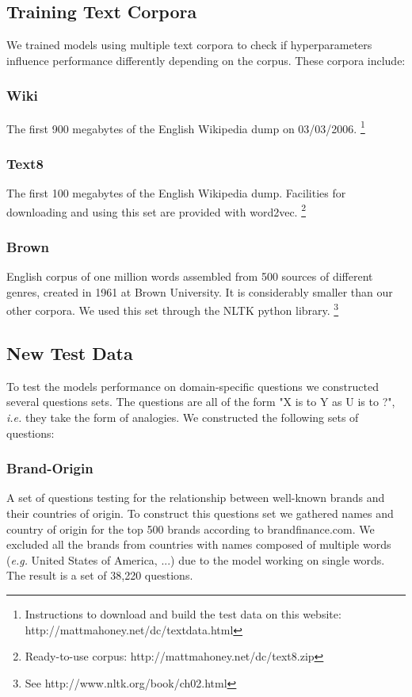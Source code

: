 \documentclass[conference]{IEEEtran}
\begin{document}
\subsection{Training Text Corpora}

We trained models using multiple text corpora to check if hyperparameters influence performance differently depending on the corpus.
These corpora include:
\subsubsection{Wiki}
The first 900 megabytes of the English Wikipedia dump on 03/03/2006.
\footnote{Instructions to download and build the test data on this website: http://mattmahoney.net/dc/textdata.html}

\subsubsection{Text8}
The first 100 megabytes of the English Wikipedia dump. Facilities for downloading and using this set are provided with word2vec.
\footnote{Ready-to-use corpus: http://mattmahoney.net/dc/text8.zip}

\subsubsection{Brown}
English corpus of one million words assembled from 500 sources of different genres, created in 1961 at Brown University.
It is considerably smaller than our other corpora.
We used this set through the NLTK python library.
\footnote{See http://www.nltk.org/book/ch02.html}

\subsection{New Test Data}
To test the models performance on domain-specific questions we constructed several 
questions sets. The questions are all of the form "X is to Y as U is to ?", \textit{i.e.} they take the 
form of analogies. We constructed the following sets of questions:

\subsubsection{Brand-Origin}
A set of questions testing for the relationship between well-known brands and their countries
of origin. To construct this questions set we gathered names and country of origin for 
the top 500 brands according to brandfinance.com. We excluded all the brands from countries
with names composed of multiple words (\textit{e.g.} United States of America, ...) due to the model 
working on single words. The result is a set of 38,220 questions.
\end{document}
